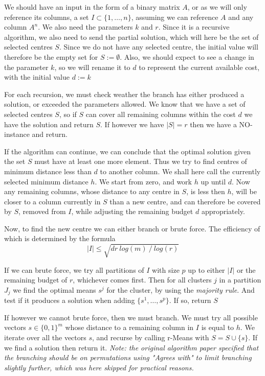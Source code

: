 \documentclass[a4paper]{article}
\begin{document}
We should have an input in the form of a binary matrix $A$, or as we will only reference its columns, a set 
$I \subset \{1,\dots,n\}$, assuming we can reference $A$ and any column $A^n$. We also need the parameters $k$ and $r$. 
Since it is a recursive algorithm, we also need to send the partial solution, which will here be the set of selected 
centres $S$. Since we do not have any selected centre, the initial value will therefore be the empty set for 
$S := \emptyset$. Also, we should expect to see a change in the parameter $k$, so we will rename it to $d$ to represent the 
current available cost, with the initial value $d := k$

For each recursion, we must check weather the branch has either produced a solution, or exceeded the parameters allowed. We know that
we have a set of selected centres $S$, so if $S$ can cover all remaining columns within the cost $d$ we have the solution and return $S$.
If however we have $|S| = r$ then we have a NO-instance and return.

If the algorithm can continue, we can conclude that the optimal solution given the set $S$ must have at least one more element. Thus
we try to find centres of minimum distance less than $d$ to another column. We shall here call the currently selected minimum 
distance $h$. We start from zero, and work $h$ up until $d$. Now any remaining columns, whose distance to any centre in $S$, 
is less then $h$, will be closer to a column currently in $S$ than a new centre, and can therefore be covered by $S$, 
removed from $I$, while adjusting the remaining budget $d$ appropriately.

Now, to find the new centre we can either branch or brute force. The efficiency of which is determined by the formula
\[
    |I| \leq \sqrt{d r ~log(m) ~/ ~log(r)}
\]

If we can brute force, we try all partitions of $I$ with size $p$ up to either $|I|$ or the remaining budget of $r$, whichever comes first. Then
for all clusters $j$ in a partition $J_j$ we find the optimal means $s^j$ for the cluster, by using the \textit{majority rule}. And test if it produces
a solution when adding $\{s^1,\dots,s^p\}$. If so, return $S$

If however we cannot brute force, then we must branch. We must try all possible vectors $s \in \{0,1\}^m$ whose distance to a remaining column in $I$
is equal to $h$. We iterate over all the vectors $s$, and recurse by calling r-Means with $S= S\cup\{s\}$. If we find a solution then return it. 
\textit{Note: the original algorithm paper \cite{fomin_golovach_panolan_2020} specified that the branching should be on permutations using "Agrees with" 
to limit branching slightly further, which was here skipped for practical reasons.}
\end{document}
